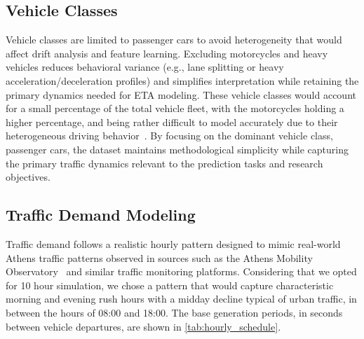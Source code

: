 \subsection{Vehicle Classes}

Vehicle classes are limited to passenger cars to avoid heterogeneity that would affect drift analysis and feature learning.
Excluding motorcycles and heavy vehicles reduces behavioral variance (e.g., lane splitting or heavy acceleration/deceleration profiles) and simplifies interpretation while retaining the primary dynamics needed for ETA modeling.
These vehicle classes would account for a small percentage of the total vehicle fleet, with the motorcycles holding a higher percentage, and being rather difficult to model accurately due to their heterogeneous driving behavior~\cite{elstat2025}.
By focusing on the dominant vehicle class, passenger cars, the dataset maintains methodological simplicity while capturing the primary traffic dynamics relevant to the prediction tasks and research objectives.

\subsection{Traffic Demand Modeling}

Traffic demand follows a realistic hourly pattern designed to mimic real-world Athens traffic patterns observed in sources such as the Athens Mobility Observatory~\cite{amob2025} and similar traffic monitoring platforms.
Considering that we opted for 10 hour simulation, we chose a pattern that would capture characteristic morning and evening rush hours with a midday decline typical of urban traffic, in between the hours of 08:00 and 18:00.
The base generation periods, in seconds between vehicle departures, are shown in \autoref{tab:hourly_schedule}.

